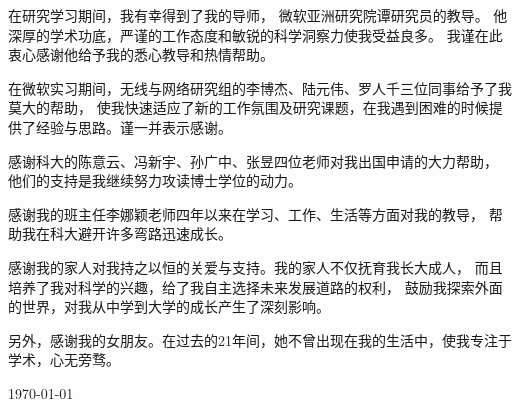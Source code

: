 \begin{acknowledgements}

在研究学习期间，我有幸得到了我的导师，
微软亚洲研究院谭研究员的教导。
他深厚的学术功底，严谨的工作态度和敏锐的科学洞察力使我受益良多。
我谨在此衷心感谢他给予我的悉心教导和热情帮助。

在微软实习期间，无线与网络研究组的李博杰、陆元伟、罗人千三位同事给予了我莫大的帮助，
使我快速适应了新的工作氛围及研究课题，在我遇到困难的时候提供了经验与思路。谨一并表示感谢。

感谢科大的陈意云、冯新宇、孙广中、张昱四位老师对我出国申请的大力帮助，
他们的支持是我继续努力攻读博士学位的动力。

感谢我的班主任李娜颖老师四年以来在学习、工作、生活等方面对我的教导，
帮助我在科大避开许多弯路迅速成长。

感谢我的家人对我持之以恒的关爱与支持。我的家人不仅抚育我长大成人，
而且培养了我对科学的兴趣，给了我自主选择未来发展道路的权利，
鼓励我探索外面的世界，对我从中学到大学的成长产生了深刻影响。

另外，感谢我的女朋友。在过去的21年间，她不曾出现在我的生活中，使我专注于学术，心无旁骛。

\bigskip
\rightline\today

\end{acknowledgements}
